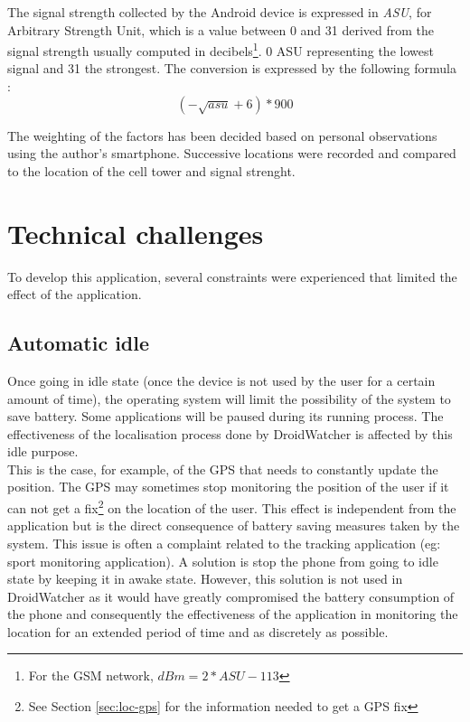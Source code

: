 The signal strength collected by the Android device is expressed in \emph{ASU}, for Arbitrary Strength Unit, which is a value between 0 and 31 derived from the signal strength usually computed in decibels\footnote{For the GSM network, $dBm = 2 * ASU - 113$}.
0 ASU representing the lowest signal and 31 the strongest.
The conversion is expressed by the following formula :\\

\[
 (-\sqrt{asu}+6)*900
\]

The weighting of the factors has been decided based on personal observations using the author's smartphone.
Successive locations were recorded and compared to the location of the cell tower and signal strenght.

\section{Technical challenges}

To develop this application, several constraints were experienced that limited the effect of the application.

\subsection{Automatic idle}

Once going in idle state (once the device is not used by the user for a certain amount of time), the operating system will limit the possibility of the system to save battery.
Some applications will be paused during its running process.
The effectiveness of the localisation process done by DroidWatcher is affected by this idle purpose.\\

This is the case, for example, of the GPS that needs to constantly update the position.
The GPS may sometimes stop monitoring the position of the user if it can not get a fix\footnote{See Section \ref{sec:loc-gps} for the information needed to get a GPS fix} on the location of the user.
This effect is independent from the application but is the direct consequence of battery saving measures taken by the system. 
This issue is often a complaint related to the tracking application (eg: sport monitoring application).
A solution is stop the phone from going to idle state by keeping it in awake state.
However, this solution is not used in DroidWatcher as it would have greatly compromised the battery consumption  of the phone and consequently the effectiveness of the application in monitoring the location for an extended period of time and as discretely as possible.

